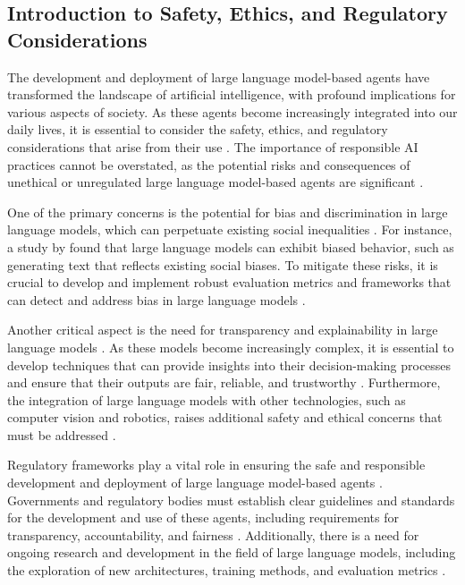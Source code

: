 \documentclass[11pt,a4paper]{article}
\begin{document}
\subsection{Introduction to Safety, Ethics, and Regulatory Considerations}


The development and deployment of large language model-based agents have transformed the landscape of artificial intelligence, with profound implications for various aspects of society. As these agents become increasingly integrated into our daily lives, it is essential to consider the safety, ethics, and regulatory considerations that arise from their use \cite{doi:10.1109/tkde.2025.3554028}. The importance of responsible AI practices cannot be overstated, as the potential risks and consequences of unethical or unregulated large language model-based agents are significant \cite{arxiv:2402.06196}. 

One of the primary concerns is the potential for bias and discrimination in large language models, which can perpetuate existing social inequalities \cite{doi:10.1007/s10849-023-09409-x}. For instance, a study by \cite{arxiv:2212.09251} found that large language models can exhibit biased behavior, such as generating text that reflects existing social biases. To mitigate these risks, it is crucial to develop and implement robust evaluation metrics and frameworks that can detect and address bias in large language models \cite{doi:10.1145/3641289}. 

Another critical aspect is the need for transparency and explainability in large language models \cite{doi:10.1016/j.tics.2023.08.006}. As these models become increasingly complex, it is essential to develop techniques that can provide insights into their decision-making processes and ensure that their outputs are fair, reliable, and trustworthy \cite{arxiv:2311.07226}. Furthermore, the integration of large language models with other technologies, such as computer vision and robotics, raises additional safety and ethical concerns that must be addressed \cite{doi:10.1145/3604237.3626869}. 

Regulatory frameworks play a vital role in ensuring the safe and responsible development and deployment of large language model-based agents \cite{arxiv:2309.14365}. Governments and regulatory bodies must establish clear guidelines and standards for the development and use of these agents, including requirements for transparency, accountability, and fairness \cite{doi:10.3390/app14052074}. Additionally, there is a need for ongoing research and development in the field of large language models, including the exploration of new architectures, training methods, and evaluation metrics \cite{arxiv:2402.01364}. 
\end{document}
